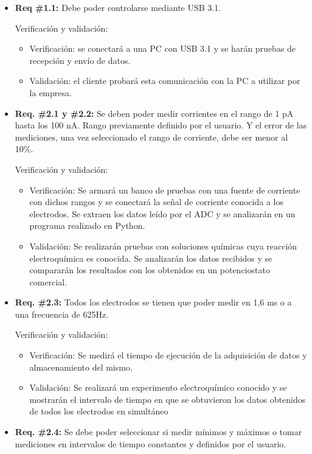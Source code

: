 \documentclass[11pt]{charter}
\begin{document}
\begin{itemize}
\item \textbf{Req \#1.1:} Debe poder controlarse mediante USB 3.1.

Verificación y validación:
\begin{itemize}
\item Verificación: se conectará a una PC con USB 3.1 y se harán pruebas de recepción y envío de datos.
\item Validación: el cliente probará esta comunicación con la PC a utilizar por la empresa.
\end{itemize}

\item\textbf{ Req. \#2.1 y \#2.2:} Se deben poder medir corrientes en el rango de 1 pA hasta los 100 nA. Rango previamente definido por el usuario. Y el error de las mediciones, una vez seleccionado el rango de corriente, debe ser menor al 10\%.

Verificación y validación:
\begin{itemize}
\item Verificación: Se armará un banco de pruebas con una fuente de corriente con dichos rangos y se conectará la señal de corriente conocida a los electrodos. Se extraen los datos leído por el ADC y se analizarán en un programa realizado en Python.
\item Validación: Se realizarán pruebas con soluciones químicas cuya reacción electroquímica es conocida. Se analizarán los datos recibidos y se compararán los resultados con los obtenidos en un potenciostato comercial.
\end{itemize}

\item \textbf{Req. \#2.3:} Todos los electrodos se tienen que poder medir en 1,6 ms o a una frecuencia de 625Hz.

Verificación y validación:
\begin{itemize}
\item Verificación: Se medirá el tiempo de ejecución de la adquisición de datos y almacenamiento del mismo.
\item Validación: Se realizará un experimento electroquímico conocido y se mostrarán el intervalo de tiempo en que se obtuvieron los datos obtenidos de todos los electrodos en simultáneo
\end{itemize}

\item \textbf{Req. \#2.4:} Se debe poder seleccionar si medir mínimos y máximos o tomar mediciones en intervalos de tiempo constantes y definidos por el usuario.


\end{itemize}
\end{document}

